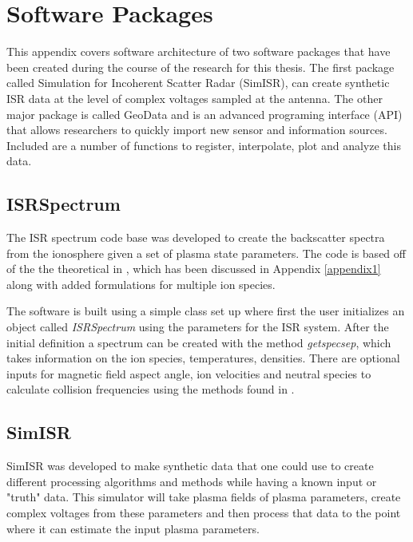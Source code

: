 \chapter{Software Packages}
\label{chapter:appsoft}
\thispagestyle{myheadings}

\graphicspath{{Appendix/Figures/}}


This appendix covers software architecture of two software packages that have been created during the course of the research for this thesis. The first package called Simulation for Incoherent Scatter Radar (SimISR), can create synthetic ISR data at the level of complex voltages sampled at the antenna. The other major package is called GeoData and is an advanced programing interface (API) that allows researchers to quickly import new sensor and information sources. Included are a number of functions to register, interpolate, plot and analyze this data.

\section{ISRSpectrum}
The ISR spectrum code base was developed to create the backscatter spectra from the ionosphere given a set of plasma state parameters. The code is based off of the the theoretical in \cite{kudeki:milla:1}, which has been discussed in Appendix \ref{appendix1} along with added formulations for multiple ion species.

The software is built using a simple class set up where first the user initializes an object called \textit{ISRSpectrum} using the parameters for the ISR system. After the initial definition a spectrum can be created with the method \textit{getspecsep}, which takes information on the ion species, temperatures, densities. There are optional inputs for magnetic field aspect angle, ion velocities and neutral species to calculate collision frequencies using the methods found in \cite{schunk2004ionospheres}.

\section{SimISR}

SimISR was developed to make synthetic data that one could use to create different processing algorithms and methods while having a known input or "truth" data. This simulator will take plasma fields of plasma parameters, create complex voltages from these parameters and then process that data to the point where it can estimate the input plasma parameters.

